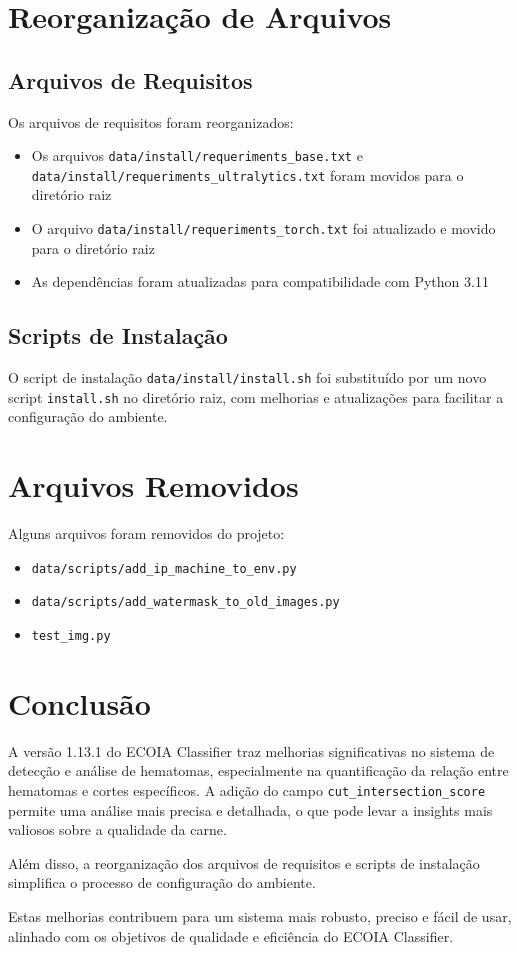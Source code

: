 \documentclass[12pt,a4paper]{article}
\begin{document}
\section{Reorganização de Arquivos}

\subsection{Arquivos de Requisitos}

Os arquivos de requisitos foram reorganizados:

\begin{itemize}
    \item Os arquivos \texttt{data/install/requeriments\_base.txt} e \texttt{data/install/requeriments\_ultralytics.txt} foram movidos para o diretório raiz
    \item O arquivo \texttt{data/install/requeriments\_torch.txt} foi atualizado e movido para o diretório raiz
    \item As dependências foram atualizadas para compatibilidade com Python 3.11
\end{itemize}

\subsection{Scripts de Instalação}

O script de instalação \texttt{data/install/install.sh} foi substituído por um novo script \texttt{install.sh} no diretório raiz, com melhorias e atualizações para facilitar a configuração do ambiente.

\section{Arquivos Removidos}

Alguns arquivos foram removidos do projeto:

\begin{itemize}
    \item \texttt{data/scripts/add\_ip\_machine\_to\_env.py}
    \item \texttt{data/scripts/add\_watermask\_to\_old\_images.py}
    \item \texttt{test\_img.py}
\end{itemize}

\section{Conclusão}

A versão 1.13.1 do ECOIA Classifier traz melhorias significativas no sistema de detecção e análise de hematomas, especialmente na quantificação da relação entre hematomas e cortes específicos. A adição do campo \texttt{cut\_intersection\_score} permite uma análise mais precisa e detalhada, o que pode levar a insights mais valiosos sobre a qualidade da carne.

Além disso, a reorganização dos arquivos de requisitos e scripts de instalação simplifica o processo de configuração do ambiente.

Estas melhorias contribuem para um sistema mais robusto, preciso e fácil de usar, alinhado com os objetivos de qualidade e eficiência do ECOIA Classifier.
\end{document}
